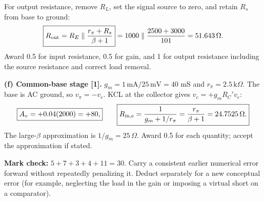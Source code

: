 \documentclass[11pt,a4paper]{article}
\newcommand{\kohm}{\,\mathrm{k}\Omega}
\begin{document}
For output resistance, remove $R_L$, set the signal source to zero, and retain $R_s$ from base to ground:
\[
\boxed{R_{\rm out}=R_E\parallel\frac{r_\pi+R_s}{\beta+1}}
=1000\parallel\frac{2500+3000}{101}=51.643\,\Omega.
\]
Award 0.5 for input resistance, 0.5 for gain, and 1 for output resistance including the source resistance and correct load removal.

\textbf{(f) Common-base stage [1].} $g_m=1\,\mathrm{mA}/25\,\mathrm{mV}=40$ mS and $r_\pi=2.5\kohm$. The base is AC ground, so $v_\pi=-v_e$. KCL at the collector gives $v_c=+g_mR_C'v_e$:
\[
\boxed{A_v=+0.04(2000)=+80,}\qquad
\boxed{R_{\rm in,e}=\frac{1}{g_m+1/r_\pi}=\frac{r_\pi}{\beta+1}=24.7525\,\Omega.}
\]
The large-$\beta$ approximation is $1/g_m=25\,\Omega$. Award 0.5 for each quantity; accept the approximation if stated.

\vfill
\textbf{Mark check:} $5+7+3+4+11=30$. Carry a consistent earlier numerical error forward without repeatedly penalizing it. Deduct separately for a new conceptual error (for example, neglecting the load in the gain or imposing a virtual short on a comparator).
\end{document}
